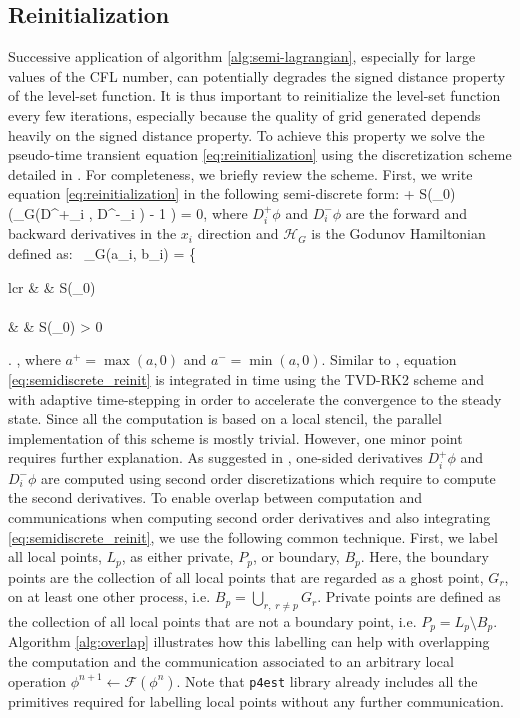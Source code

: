 \subsection{Reinitialization}
Successive application of algorithm \ref{alg:semi-lagrangian}, especially for large values of the CFL number, can potentially degrades the signed distance property of the level-set function. It is thus important to reinitialize the level-set function every few iterations, especially because the quality of grid generated depends heavily on the signed distance property. To achieve this property we solve the pseudo-time transient equation \eqref{eq:reinitialization} using the discretization scheme detailed in \cite{Min;Gibou:07:A-second-order-accur}. For completeness, we briefly review the scheme. First, we write equation \eqref{eq:reinitialization} in the following semi-discrete form:
\be
{} + S(\phi_0) \left(_G(D^+_i \phi, D^-_i \phi) - 1 \right) = 0,
\label{eq:semidiscrete_reinit}
\ee
where $D^+_i \phi$ and $D^-_i \phi$ are the forward and backward derivatives in the $x_i$ direction and $\mathcal{H}_G$ is the Godunov Hamiltonian defined as:\
\ben
{}_G(a_i, b_i) = 
\left\{
\begin{array}{lcr}
	 & \hspace {5 mm}  & S(\phi_0)  \\
	\\
	 & \hspace {5 mm}  & S(\phi_0)  >  0 
\end{array}
\right.
,
\een
where $a^+ = \max(a, 0)$ and $a^- = \min(a, 0)$. Similar to \cite{Min;Gibou:07:A-second-order-accur}, equation \eqref{eq:semidiscrete_reinit} is integrated in time using the TVD-RK2 scheme and with adaptive time-stepping in order to accelerate the convergence to the steady state. Since all the computation is based on a local stencil, the parallel implementation of this scheme is mostly trivial. However, one minor point requires further explanation. As suggested in \cite{Min;Gibou:07:A-second-order-accur}, one-sided derivatives $D^+_i \phi$ and $D^-_i \phi$ are computed using second order discretizations which require to compute the second derivatives. To enable overlap between computation and communications when computing second order derivatives and also integrating \eqref{eq:semidiscrete_reinit}, we use the following common technique. First, we label all local points, $L_p$, as either private, $P_p$, or boundary, $B_p$. Here, the boundary points are the collection of all local points that are regarded as a ghost point, $G_r$, on at least one other process, i.e. $B_p = \underset{r,\;r\neq p}{\bigcup} G_r$. Private points are defined as the collection of all local points that are not a boundary point, i.e. $P_p = L_p \setminus B_p$. Algorithm \ref{alg:overlap} illustrates how this labelling can help with overlapping the computation and the communication associated to an arbitrary local operation $\phi^{n+1} \gets \mathcal{F}(\phi^n)$. Note that \texttt{p4est} library already includes all the primitives required for labelling local points without any further communication.

